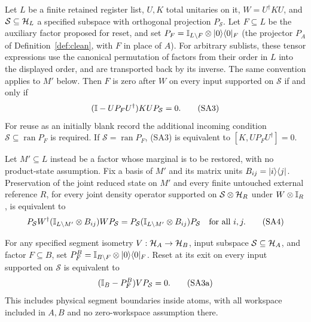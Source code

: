 \begin{theorem}
\label{thm:sA-recursive}
Let $L$ be a finite retained register list, $U,K$ total unitaries on it,
$W=U^\dagger KU$, and $\mathcal S\subseteq\mathcal{H}_L$ a specified subspace
with orthogonal projection $P_{\mathcal S}$. Let $F\subseteq L$ be the
auxiliary factor proposed for reset, and set
$P_F=\mathbb{I}_{L\setminus F}\otimes\lvert 0\rangle\langle 0\rvert_F$ (the projector $P_A$ of
Definition~\ref{def:clean}, with $F$ in place of $A$). For arbitrary sublists,
these tensor expressions use the canonical permutation of factors from
their order in $L$ into the displayed order, and are transported back
by its inverse. The same convention applies to $M'$ below.
Then $F$ is zero after $W$ on every input
supported on $\mathcal S$ if and only if
\[
 (\mathbb{I}-UP_FU^\dagger)KU P_{\mathcal S}=0.                  \tag{SA3}
\]
For reuse as an initially blank record the additional incoming condition
$\mathcal S\subseteq\operatorname{ran}P_F$ is required. If
$\mathcal S=\operatorname{ran}P_F$, (SA3) is equivalent to
$[K,UP_FU^\dagger]=0$.

Let $M'\subseteq L$ instead be a factor whose marginal is to be restored,
with no product-state assumption. Fix a basis of $M'$ and its matrix
units $B_{ij}=\lvert i\rangle\langle j\rvert$. Preservation of the joint reduced state
on $M'$ and every finite untouched external reference $R$, for every
joint density operator supported on $\mathcal S\otimes\mathcal{H}_R$ under
$W\otimes\mathbb{I}_R$, is equivalent to
\[
 P_{\mathcal S}W^\dagger(\mathbb{I}_{L\setminus M'}\otimes B_{ij})
 WP_{\mathcal S}
 =P_{\mathcal S}(\mathbb{I}_{L\setminus M'}\otimes B_{ij})
 P_{\mathcal S}\quad\hbox{for all }i,j.                 \tag{SA4}
\]

For any specified segment isometry $V:\mathcal{H}_A\to\mathcal{H}_B$, input
subspace $\mathcal S\subseteq\mathcal{H}_A$, and factor $F\subseteq B$,
set $P_F^B=\mathbb{I}_{B\setminus F}\otimes\lvert 0\rangle\langle 0\rvert_F$. Reset at its exit
on every input supported on $\mathcal S$ is equivalent to
\[
 (\mathbb{I}_B-P_F^B)VP_{\mathcal S}=0.                       \tag{SA3a}
\]
This includes physical segment boundaries inside atoms, with all
workspace included in $A,B$ and no zero-workspace assumption there.


\end{theorem}
